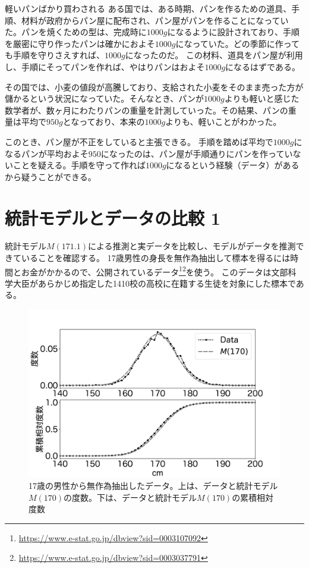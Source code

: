\begin{SMbox}{軽いパンばかり買わされる}
ある国では、ある時期、パンを作るための道具、手順、材料が政府からパン屋に配布され、パン屋がパンを作ることになっていた。パンを焼くための型は、完成時に$1000g$になるように設計されており、手順を厳密に守り作ったパンは確かにおよそ$1000g$になっていた。どの季節に作っても手順を守りさえすれば、$1000g$になったのだ。
この材料、道具をパン屋が利用し、手順にそってパンを作れば、やはりパンはおよそ$1000g$になるはずである。

その国では、小麦の値段が高騰しており、支給された小麦をそのまま売った方が儲かるという状況になっていた。そんなとき、パンが$1000g$よりも軽いと感じた数学者が、数ヶ月にわたりパンの重量を計測していった。その結果、パンの重量は平均で$950g$となっており、本来の$1000g$よりも、軽いことがわかった。

このとき、パン屋が不正をしていると主張できる。
手順を踏めば平均で$1000g$になるパンが平均およそ$950$になったのは、パン屋が手順通りにパンを作っていないことを疑える。手順を守って作れば$1000g$になるという経験（データ）があるから疑うことができる。
\end{SMbox}


\section{統計モデルとデータの比較 1}
統計モデル$M(171.1)$による推測と実データを比較し、モデルがデータを推測できていることを確認する。
17歳男性の身長を無作為抽出して標本を得るには時間とお金がかかるので、公開されているデータ\footnote{ \url{https://www.e-stat.go.jp/dbview?sid=0003107092} }\footnote{\url{https://www.e-stat.go.jp/dbview?sid=0003037791}}を使う。
このデータは文部科学大臣があらかじめ指定した1410校の高校に在籍する生徒を対象にした標本である。

\begin{figure}
\begin{center}
    \includegraphics[width=15cm]{./image/03_/cm_data.pdf}
    \caption{17歳の男性から無作為抽出したデータ。上は、データと統計モデル$M(170)$の度数。下は、データと統計モデル$M(170)$の累積相対度数}
    \label{fig:real_height_men}
\end{center}
\end{figure}



